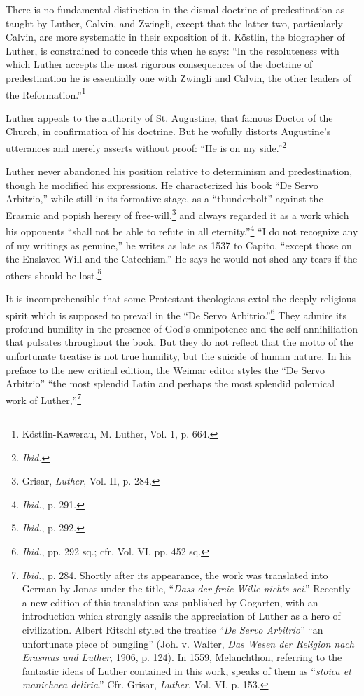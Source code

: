There is no fundamental distinction in the dismal doctrine of
predestination as taught by Luther, Calvin, and Zwingli, except
that the latter two, particularly Calvin, are more systematic in their
exposition of it. Köstlin, the biographer of Luther, is constrained
to concede this when he says: “In the resoluteness with which Luther
accepts the most rigorous consequences of the doctrine of predestination
he is essentially one with Zwingli and Calvin, the other leaders
of the Reformation.”\footnote{Köstlin-Kawerau, M. Luther, Vol. 1, p. 664.}

Luther appeals to the authority of St. Augustine, that famous
Doctor of the Church, in confirmation of his doctrine. But he
wofully distorts Augustine’s utterances and merely asserts without
proof: “He is on my side.”\footnote{\textit{Ibid.}}

Luther never abandoned his position relative to determinism and
predestination, though he modified his expressions. He characterized
his book “De Servo Arbitrio,” while still in its formative stage, as
a “thunderbolt” against the Erasmic and popish heresy of free-will,\footnote
{Grisar, \textit{Luther}, Vol. II, p. 284.}
and always regarded it as a work which his opponents “shall
not be able to refute in all eternity.”\footnote{\textit{Ibid.}, p. 291.}
“I do not recognize any
of my writings as genuine,'' he writes as late as 1537 to Capito,
``except those on the Enslaved Will and the Catechism.'' He says
he would not shed any tears if the others should be lost.\footnote{\textit{Ibid.}, p. 292.}

It is incomprehensible that some Protestant theologians extol the
deeply religious spirit which is supposed to prevail in the “De Servo
Arbitrio.”\footnote
{\textit{Ibid.}, pp. 292 sq.; cfr. Vol. VI, pp. 452 sq.}
They admire its profound humility in the presence
of God’s omnipotence and the self-annihiliation that pulsates
throughout the book. But they do not reflect that the motto of the
unfortunate treatise is not true humility, but the suicide of human
nature. In his preface to the new critical edition, the Weimar editor
styles the “De Servo Arbitrio” “the most splendid Latin and perhaps
the most splendid polemical work of Luther,”\footnote
{\textit{Ibid.}, p. 284. Shortly after its appearance, the work was translated into German by
Jonas under the title, “\textit{Dass der freie Wille nichts sei}.” Recently a new edition of
this translation was published by Gogarten, with an introduction which strongly assails
the appreciation of Luther as a hero of civilization. Albert Ritschl styled the treatise ``\textit{De Servo
Arbitrio}'' “an unfortunate piece of bungling” (Joh. v. Walter, \textit{Das Wesen der Religion
nach Erasmus und Luther}, 1906, p. 124). In 1559, Melanchthon, referring to the fantastic
ideas of Luther contained in this work, speaks of them as “\textit{stoica et manichaea
deliria}.” Cfr. Grisar, \textit{Luther}, Vol. VI, p. 153.}

